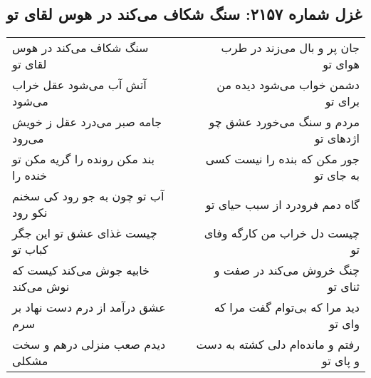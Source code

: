 \begin{center}
\section*{غزل شماره ۲۱۵۷: سنگ شکاف می‌کند در هوس لقای تو}
\label{sec:2157}
\begin{longtable}{l p{0.5cm} r}
سنگ شکاف می‌کند در هوس لقای تو
&&
جان پر و بال می‌زند در طرب هوای تو
\\
آتش آب می‌شود عقل خراب می‌شود
&&
دشمن خواب می‌شود دیده من برای تو
\\
جامه صبر می‌درد عقل ز خویش می‌رود
&&
مردم و سنگ می‌خورد عشق چو اژدهای تو
\\
بند مکن رونده را گریه مکن تو خنده را
&&
جور مکن که بنده را نیست کسی به جای تو
\\
آب تو چون به جو رود کی سخنم نکو رود
&&
گاه دمم فرودرد از سبب حیای تو
\\
چیست غذای عشق تو این جگر کباب تو
&&
چیست دل خراب من کارگه وفای تو
\\
خابیه جوش می‌کند کیست که نوش می‌کند
&&
چنگ خروش می‌کند در صفت و ثنای تو
\\
عشق درآمد از درم دست نهاد بر سرم
&&
دید مرا که بی‌توام گفت مرا که وای تو
\\
دیدم صعب منزلی درهم و سخت مشکلی
&&
رفتم و مانده‌ام دلی کشته به دست و پای تو
\\
\end{longtable}
\end{center}
